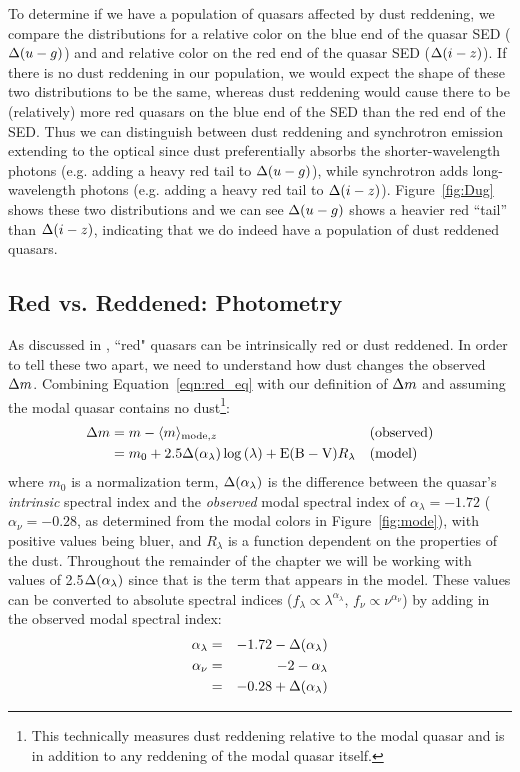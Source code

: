 To determine if we have a population of quasars affected by dust reddening, we compare the distributions for a relative color on the blue end of the quasar SED ($\Delta(u-g)$) and and relative color on the red end of the quasar SED ($\Delta(i-z)$).  If there is no dust reddening in our population, we would expect the shape of these two distributions to be the same, whereas dust reddening would cause there to be (relatively) more red quasars on the blue end of the SED than the red end of the SED.  Thus we can distinguish between dust reddening and synchrotron emission extending to the optical since dust preferentially absorbs the shorter-wavelength photons (e.g. adding a heavy red tail to $\Delta(u-g)$), while synchrotron adds long-wavelength photons (e.g. adding a heavy red tail to $\Delta(i-z)$).  Figure~\ref{fig:Dug} shows these two distributions and we can see $\Delta(u-g)$ shows a heavier red ``tail'' than $\Delta(i-z)$, indicating that we do indeed have a population of dust reddened quasars.


\subsection{Red vs. Reddened: Photometry} \label{sec:red_v_red:phot}

As discussed in \citet{Richards:2003}, ``red" quasars can be intrinsically red or dust reddened.  In order to tell these two apart, we need to understand how dust changes the observed $\Delta m$.  Combining Equation~\ref{eqn:red_eq} with our definition of $\Delta m$ and assuming the modal quasar contains no dust\footnote{This technically measures dust reddening relative to the modal quasar and is in addition to any reddening of the modal quasar itself.}:
\begin{align} \label{eqn:rel_red_eq} 
\mrel&=m - \langle m \rangle_{{\rm mode},z} &&{\rm  (observed)} \nonumber \\
&=m_0 + 2.5\dal \log{(\lambda)} + \ebv R_\lambda &&{\rm  (model)}
\end{align}
where $m_0$ is a normalization term, $\Delta(\alpha_{\lambda})$ is the difference between the quasar's {\em intrinsic} spectral index and the {\em observed} modal spectral index of $\alpha_{\lambda} =-1.72$ ($\alpha_{\nu}=-0.28$, as determined from the modal colors in Figure~\ref{fig:mode}), with positive values being bluer, and $R_{\lambda}$ is a function dependent on the properties of the dust.  Throughout the remainder of the chapter we will be working with values of 2.5$\Delta(\alpha_{\lambda})$ since that is the term that appears in the model.  These values can be converted to absolute spectral indices ($f_{\lambda} \propto \lambda^{\alpha_{\lambda}}$, $f_{\nu} \propto \nu^{\alpha_{\nu}}$) by adding in the observed modal spectral index:
\begin{eqnarray}
	\alpha_{\lambda} &=& -1.72 - \dal \label{eqn:dal_2_al} \\
	\alpha_{\nu} &=& -2-\alpha_{\lambda} \nonumber \\
	&=& -0.28 + \dal \label{eqn:dal_2_anu}
\end{eqnarray}

